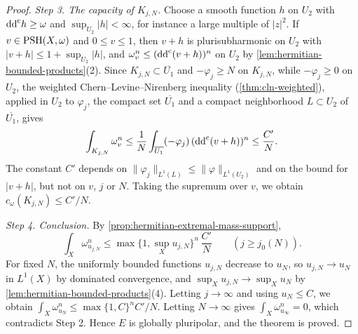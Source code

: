 \begin{proof}
\emph{Step 3. The capacity of $K_{j,N}$.} Choose a smooth function $h$ on $U_2$ with $\mathrm{dd}^{\mathrm{c}} h\geq\omega$ and $\sup_{U_2}|h|<\infty$, for instance a large multiple of $|z|^2$. If $v\in\mathrm{PSH}(X,\omega)$ and $0\leq v\leq1$, then $v+h$ is plurisubharmonic on $U_2$ with $|v+h|\leq1+\sup_{U_2}|h|$, and $\omega_v^n\leq(\mathrm{dd}^{\mathrm{c}}(v+h))^n$ on $U_2$ by \cref{lem:hermitian-bounded-products}(2). Since $K_{j,N}\subset\overline{U_1}$ and $-\varphi_j\geq N$ on $K_{j,N}$, while $-\varphi_j\geq0$ on $U_2$, the weighted Chern--Levine--Nirenberg inequality (\cref{thm:cln-weighted}), applied in $U_2$ to $\varphi_j$, the compact set $\overline{U_1}$ and a compact neighborhood $L\subset U_2$ of $\overline{U_1}$, gives
\[
 \int_{K_{j,N}}\omega_v^n
 \leq\frac1N\int_{\overline{U_1}}(-\varphi_j)\,(\mathrm{dd}^{\mathrm{c}}(v+h))^n
 \leq\frac{C'}N.
\]
The constant $C'$ depends on $\|\varphi_j\|_{L^1(L)}\leq\|\varphi\|_{L^1(U_2)}$ and on the bound for $|v+h|$, but not on $v$, $j$ or $N$. Taking the supremum over $v$, we obtain $c_\omega(K_{j,N})\leq C'/N$.

\emph{Step 4. Conclusion.} By \cref{prop:hermitian-extremal-mass-support},
\[
 \int_X\omega_{u_{j,N}}^n\leq\max\{1,\sup_Xu_{j,N}\}^n\,\frac{C'}N\qquad(j\geq j_0(N)).
\]
For fixed $N$, the uniformly bounded functions $u_{j,N}$ decrease to $u_N$, so $u_{j,N}\to u_N$ in $L^1(X)$ by dominated convergence, and $\sup_Xu_{j,N}\to\sup_Xu_N$ by \cref{lem:hermitian-bounded-products}(4). Letting $j\to\infty$ and using $u_N\leq C$, we obtain $\int_X\omega_{u_N}^n\leq\max\{1,C\}^nC'/N$. Letting $N\to\infty$ gives $\int_X\omega_{u_\infty}^n=0$, which contradicts Step 2. Hence $E$ is globally pluripolar, and the theorem is proved.
\end{proof}
